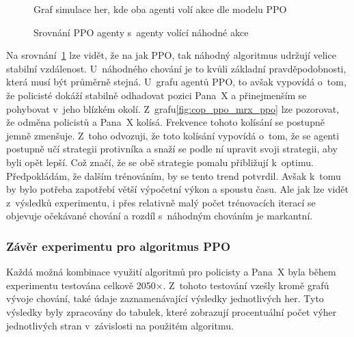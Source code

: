 \begin{figure}[H]
\begin{minipage}{.48\textwidth}
      \caption{Graf simulace her, kde oba agenti volí akce dle modelu PPO}
      \label{fig:cop_ppo_mrx_ppo}
  \end{minipage}
  \caption{Srovnání PPO agenty s~agenty volící náhodné akce}
  \label{fig:srovnani_random_ppo}
  \end{figure}

Na srovnání~\ref{fig:srovnani_random_ppo} lze vidět, že na jak PPO, tak náhodný algoritmus udržují velice stabilní vzdálenost.
U~náhodného chování je to kvůli základní pravděpodobnosti, která musí být průměrně stejná.
U~grafu agentů PPO, to avšak vypovídá o~tom, že policisté dokáží stabilně odhadovat pozici Pana~X a přinejmenším se pohybovat v~jeho blízkém okolí.
Z~grafu\ref{fig:cop_ppo_mrx_ppo} lze pozorovat, že odměna policistů a Pana~X kolísá.
Frekvence tohoto kolísání se postupně jemně zmenšuje.
Z~toho odvozuji, že toto kolísání vypovídá o~tom, že se agenti postupně učí strategii protivníka a snaží se podle ní upravit svoji strategii, aby byli opět lepší.
Což značí, že se obě strategie pomalu přibližují k~optimu.
Předpokládám, že dalším trénováním, by se tento trend potvrdil.
Avšak k~tomu by bylo potřeba zapotřebí větší výpočetní výkon a spoustu času.
Ale jak lze vidět z~výsledků experimentu, i přes relativně malý počet trénovacích iterací se objevuje očekávané chování a rozdíl s~náhodným chováním je markantní.

\subsubsection*{Závěr experimentu pro algoritmus PPO}

Každá možná kombinace využití algoritmů pro policisty a Pana~X byla během experimentu testována celkově 2050$\times$.
Z~tohoto testování vzešly kromě grafů vývoje chování, také údaje zaznamenávající výsledky jednotlivých her.
Tyto výsledky byly zpracovány do tabulek, které zobrazují procentuální počet výher jednotlivých stran v~závislosti na použitém algoritmu.

